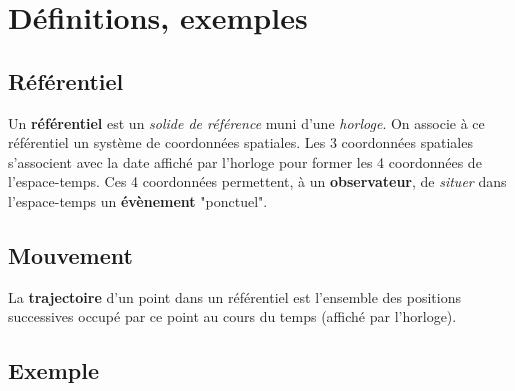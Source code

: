 
\section{Définitions, exemples}

\subsection{Référentiel}

Un {\bf référentiel} est un {\it solide de référence} muni d'une {\it horloge}. On associe à ce référentiel un système de coordonnées spatiales. Les 3 coordonnées spatiales s'associent avec la date affiché par l'horloge pour former les 4 coordonnées de l'espace-temps. Ces 4 coordonnées permettent, à un {\bf observateur}, de {\it situer} dans l'espace-temps un {\bf évènement} "ponctuel".

\subsection{Mouvement}

La {\bf trajectoire} d'un point dans un référentiel est l'ensemble des positions successives occupé par ce point au cours du temps (affiché par l'horloge).


\subsection{Exemple}

